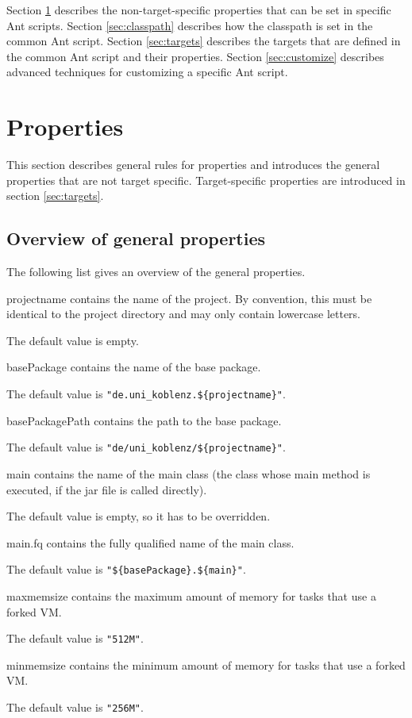 \documentclass[a4paper,twoside,11pt,bibtotoc]{article}
\begin{document}

Section \ref{sec:properties} describes the non-target-specific properties that can be set in specific Ant scripts.
Section \ref{sec:classpath} describes how the classpath is set in the common Ant script.
Section \ref{sec:targets} describes the targets that are defined in the common Ant script and their properties.
Section \ref{sec:customize} describes advanced techniques for customizing a specific Ant script.

\section{Properties}
\label{sec:properties}
This section describes general rules for properties and introduces the general properties that are not target specific.
Target-specific properties are introduced in section \ref{sec:targets}.

\subsection{Overview of general properties}
The following list gives an overview of the general properties.
\begin{description*}
	\item[projectname] contains the name of the project. By convention, this must be identical to the project directory and may only contain lowercase letters.\par The default value is empty.
	\item[basePackage] contains the name of the base package.\par The default value is \texttt{"de.uni\_koblenz.\$\{projectname\}"}.
	\item[basePackagePath] contains the path to the base package.\par The default value is \texttt{"de/uni\_koblenz/\$\{projectname\}"}.
	\item[main] contains the name of the main class (the class whose main method is executed, if the jar file is called directly).\par The default value is empty, so it has to be overridden.
	\item[main.fq] contains the fully qualified name of the main class.\par The default value is \texttt{"\$\{basePackage\}.\$\{main\}"}.
	\item[maxmemsize] contains the maximum amount of memory for tasks that use a forked VM.\par The default value is \texttt{"512M"}.
	\item[minmemsize] contains the minimum amount of memory for tasks that use a forked VM.\par The default value is \texttt{"256M"}.
\end{description*}	
\end{document}
